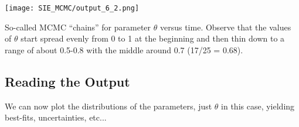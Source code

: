 \begin{Shaded}
\begin{Highlighting}[]
\NormalTok{,}
\end{Highlighting}
\end{Shaded}

\begin{Shaded}
\begin{Highlighting}[]
 
     
\end{Highlighting}
\end{Shaded}

\begin{Shaded}
\begin{Highlighting}[]
                \NormalTok{,}\NormalTok{))}
\end{Highlighting}
\end{Shaded}

\begin{marginfigure}
\centering
\texttt{[image: SIE\_MCMC/output\_6\_2.png]}
\caption{So-called MCMC ``chains'' for parameter $\theta$ versus time.  Observe that the values of  $\theta$  start spread evenly from 0 to 1 at the beginning and then thin down to a range of about 0.5-0.8 with the middle around 0.7 (17/25 = 0.68).}
\end{marginfigure}

\begin{Shaded}
\begin{Highlighting}[]
\NormalTok{)}
\end{Highlighting}
\end{Shaded}

\subsection{Reading the Output}

We can now plot the distributions of the parameters, just $\theta$ in this case, yielding best-fits, uncertainties, etc...



\begin{Shaded}
\begin{Highlighting}[]
\end{Highlighting}
\end{Shaded}

